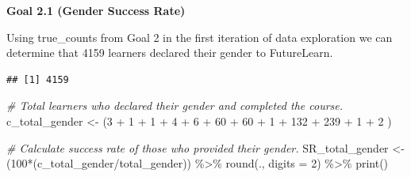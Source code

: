 \documentclass[
]{article}
\newenvironment{Shaded}{\begin{snugshade}}{\end{snugshade}}
\newcommand{\AttributeTok}[1]{\textcolor[rgb]{0.77,0.63,0.00}{#1}}
\newcommand{\CommentTok}[1]{\textcolor[rgb]{0.56,0.35,0.01}{\textit{#1}}}
\newcommand{\DecValTok}[1]{\textcolor[rgb]{0.00,0.00,0.81}{#1}}
\newcommand{\FunctionTok}[1]{\textcolor[rgb]{0.00,0.00,0.00}{#1}}
\newcommand{\NormalTok}[1]{#1}
\newcommand{\OtherTok}[1]{\textcolor[rgb]{0.56,0.35,0.01}{#1}}
\newcommand{\SpecialCharTok}[1]{\textcolor[rgb]{0.00,0.00,0.00}{#1}}
\newcommand{\StringTok}[1]{\textcolor[rgb]{0.31,0.60,0.02}{#1}}
\begin{document}
\textbf{Goal 2.1 (Gender Success Rate)}

Using true\_counts from Goal 2 in the first iteration of data
exploration we can determine that 4159 learners declared their gender to
FutureLearn.

\begin{Shaded}
\end{Shaded}

\begin{verbatim}
## [1] 4159
\end{verbatim}

\begin{Shaded}
\begin{Highlighting}[]
\CommentTok{\# Total learners who declared their gender and completed the course.}
\NormalTok{c\_total\_gender }\OtherTok{\textless{}{-}}\NormalTok{ (}\DecValTok{3} \SpecialCharTok{+} \DecValTok{1} \SpecialCharTok{+} \DecValTok{1} \SpecialCharTok{+} \DecValTok{4} \SpecialCharTok{+} \DecValTok{6} \SpecialCharTok{+} \DecValTok{60} \SpecialCharTok{+} \DecValTok{60} \SpecialCharTok{+} \DecValTok{1} \SpecialCharTok{+} \DecValTok{132} \SpecialCharTok{+} \DecValTok{239} \SpecialCharTok{+} \DecValTok{1} \SpecialCharTok{+} \DecValTok{2}\NormalTok{ )}

\CommentTok{\# Calculate success rate of those who provided their gender.}
\NormalTok{SR\_total\_gender }\OtherTok{\textless{}{-}}\NormalTok{ (}\DecValTok{100}\SpecialCharTok{*}\NormalTok{(c\_total\_gender}\SpecialCharTok{/}\NormalTok{total\_gender)) }\SpecialCharTok{\%\textgreater{}\%}
  \FunctionTok{round}\NormalTok{(., }\AttributeTok{digits =} \DecValTok{2}\NormalTok{) }\SpecialCharTok{\%\textgreater{}\%}
  \FunctionTok{print}\NormalTok{()}
\end{Highlighting}
\end{Shaded}
\end{document}
